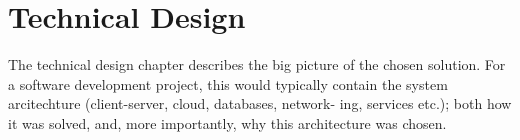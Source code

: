 \chapter{Technical Design}

The technical design chapter describes the big picture of the chosen solution. For a software development project, this would typically contain the system arcitechture (client-server, cloud, databases, network- ing, services etc.); both how it was solved, and, more importantly, why this architecture was chosen.